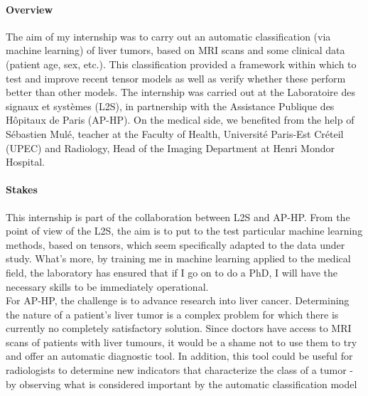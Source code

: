 \documentclass[preprint,12pt]{elsarticle}
\begin{document}
\paragraph*{Overview} The aim of my internship was to carry out an automatic classification (via machine learning) of liver tumors, based on MRI scans and some clinical data (patient age, sex, etc.). This classification provided a framework within which to test and improve recent tensor models \cite{multi_rank_1,multi_rank_r} as well as verify whether these perform better than other models. The internship was carried out at the Laboratoire des signaux et systèmes (L2S), in partnership with the Assistance Publique des Hôpitaux de Paris (AP-HP). On the medical side, we benefited from the help of Sébastien Mulé, teacher at the Faculty of Health, Université Paris-Est Créteil (UPEC) and Radiology, Head of the Imaging Department at Henri Mondor Hospital.

\paragraph*{Stakes} This internship is part of the collaboration between L2S and AP-HP. From the point of view of the L2S, the aim is to put to the test particular machine learning methods, based on tensors, which seem specifically adapted to the data under study. What's more, by training me in machine learning applied to the medical field, the laboratory has ensured that if I go on to do a PhD, I will have the necessary skills to be immediately operational.\\
\indent For AP-HP, the challenge is to advance research into liver cancer. Determining the nature of a patient's liver tumor is a complex problem for which there is currently no completely satisfactory solution. Since doctors have access to MRI scans of patients with liver tumours, it would be a shame not to use them to try and offer an automatic diagnostic tool. In addition, this tool could be useful for radiologists to determine new indicators that characterize the class of a tumor - by observing what is considered important by the automatic classification model
\end{document}
